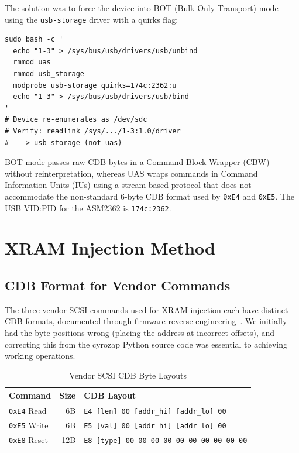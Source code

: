 \documentclass[conference]{IEEEtran}
\begin{document}
The solution was to force the device into BOT (Bulk-Only Transport) mode
using the \texttt{usb-storage} driver with a quirks flag:

\begin{lstlisting}[style=shell,caption={Switching from UAS to BOT mode
for vendor command support.},label={lst:bot-switch}]
sudo bash -c '
  echo "1-3" > /sys/bus/usb/drivers/usb/unbind
  rmmod uas
  rmmod usb_storage
  modprobe usb-storage quirks=174c:2362:u
  echo "1-3" > /sys/bus/usb/drivers/usb/bind
'
# Device re-enumerates as /dev/sdc
# Verify: readlink /sys/.../1-3:1.0/driver
#   -> usb-storage (not uas)
\end{lstlisting}

BOT mode passes raw CDB bytes in a Command Block Wrapper (CBW) without
reinterpretation, whereas UAS wraps commands in Command Information
Units (IUs) using a stream-based protocol that does not accommodate the
non-standard 6-byte CDB format used by \texttt{0xE4} and \texttt{0xE5}.
The USB VID:PID for the ASM2362 is \texttt{174c:2362}.


\section{XRAM Injection Method}
\label{sec:method}

\subsection{CDB Format for Vendor Commands}
\label{sec:vendor-cdb}

The three vendor SCSI commands used for XRAM injection each have
distinct CDB formats, documented through firmware reverse
engineering~\cite{cyrozap-usb-pcie}. We initially had the byte positions
wrong (placing the address at incorrect offsets), and correcting this
from the cyrozap Python source code was essential to achieving working
operations.

\begin{table}[ht]
\centering
\caption{Vendor SCSI CDB Byte Layouts}
\label{tab:vendor-cdb}
\begin{tabular}{@{}lrl@{}}
\toprule
Command & Size & CDB Layout \\
\midrule
\texttt{0xE4} Read & 6B &
  \texttt{E4 [len] 00 [addr\_hi] [addr\_lo] 00} \\
\texttt{0xE5} Write & 6B &
  \texttt{E5 [val] 00 [addr\_hi] [addr\_lo] 00} \\
\texttt{0xE8} Reset & 12B &
  \texttt{E8 [type] 00 00 00 00 00 00 00 00 00 00} \\
\bottomrule
\end{tabular}
\end{table}
\end{document}
